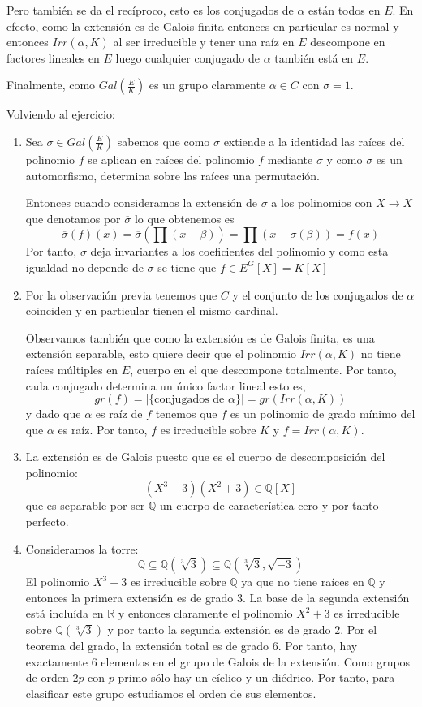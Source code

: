 Pero también se da el recíproco, esto es los conjugados de $\alpha$ están todos en $E$. En efecto, como la extensión es de Galois finita entonces en particular es normal y entonces $Irr(\alpha,K)$ al ser irreducible y tener una raíz en $E$ descompone en factores lineales en $E$ luego cualquier conjugado de $\alpha$ también está en $E$. 

Finalmente, como $Gal(\frac{E}{K})$ es un grupo claramente $\alpha \in C$ con $\sigma = 1$. 

Volviendo al ejercicio:

\begin{enumerate}
\item Sea $\sigma \in Gal(\frac{E}{K})$ sabemos que como $\sigma$ extiende a la identidad las raíces del polinomio $f$ se aplican en raíces del polinomio $f$ mediante $\sigma$ y como $\sigma$ es un automorfismo, determina sobre las raíces una permutación. 

Entonces cuando consideramos la extensión de $\sigma$ a los polinomios con $X \to X$ que denotamos por $\overline{\sigma}$ lo que obtenemos es $$\overline{\sigma}(f)(x) = \overline{\sigma}(\prod (x - \beta)) = \prod (x - \sigma(\beta)) = f(x)$$ Por tanto, $\sigma$ deja invariantes a los coeficientes del polinomio y como esta igualdad no depende de $\sigma$ se tiene que $f \in E^G[X] = K[X]$
\item Por la observación previa tenemos que $C$ y el conjunto de los conjugados de $\alpha$ coinciden y en particular tienen el mismo cardinal. 

Observamos también que como la extensión es de Galois finita, es una extensión separable, esto quiere decir que el polinomio $Irr(\alpha,K)$ no tiene raíces múltiples en $E$, cuerpo en el que descompone totalmente. Por tanto, cada conjugado determina un único factor lineal esto es, $$gr(f) = |\{ \text{conjugados de  } \alpha \}|= gr(Irr(\alpha,K))$$ y dado que $\alpha$ es raíz de $f$ tenemos que $f$ es un polinomio de grado mínimo del que $\alpha$ es raíz. Por tanto, $f$ es irreducible sobre $K$ y $f = Irr(\alpha,K)$. 

\item La extensión es de Galois puesto que es el cuerpo de descomposición del polinomio: $$(X^3-3)(X^2+3) \in \mathbb{Q}[X]$$ que es separable por ser $\mathbb{Q}$ un cuerpo de característica cero y por tanto perfecto. 

\item Consideramos la torre: $$\mathbb{Q} \subseteq \mathbb{Q}(\sqrt[3]{3}) \subseteq \mathbb{Q}(\sqrt[3]{3},\sqrt{-3})$$ El polinomio $X^3-3$ es irreducible sobre $\mathbb{Q}$ ya que no tiene raíces en $\mathbb{Q}$ y entonces la primera extensión es de grado 3. La base de la segunda extensión está incluída en $\mathbb{R}$ y entonces claramente el polinomio $X^2 + 3$ es irreducible sobre $\mathbb{Q}(\sqrt[3]{3})$ y por tanto la segunda extensión es de grado 2. Por el teorema del grado, la extensión total es de grado 6. Por tanto, hay exactamente 6 elementos en el grupo de Galois de la extensión. Como grupos de orden $2p$ con $p$ primo sólo hay un cíclico y un diédrico. Por tanto, para clasificar este grupo estudiamos el orden de sus elementos. 


\end{enumerate}

